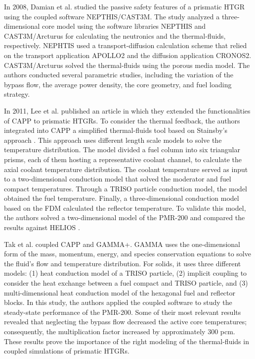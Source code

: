In 2008, Damian et al. \cite{damian_vhtr_2008} studied the passive safety features of a prismatic HTGR using the coupled software NEPTHIS/CAST3M\cite{cavalier_presentation_2005}\cite{studer_cast3marcturus_2007}.
The study analyzed a three-dimensional core model using the software libraries NEPTHIS and CAST3M/Arcturus for calculating the neutronics and the thermal-fluids, respectively.
NEPHTIS used a transport-diffusion calculation scheme that relied on the transport application APOLLO2 \cite{sanchez_apollo2_1999} and the diffusion application CRONOS2.
CAST3M/Arcturus solved the thermal-fluids using the porous media model.
The authors conducted several parametric studies, including the variation of the bypass flow, the average power density, the core geometry, and fuel loading strategy.

In 2011, Lee et al. published an article \cite{lee_development_2011} in which they extended the functionalities of CAPP to prismatic HTGRs.
To consider the thermal feedback, the authors integrated into CAPP a simplified thermal-fluids tool based on Stainsby's approach \cite{stainsby_investigation_2008}.
This approach uses different length scale models to solve the temperature distribution.
The model divided a fuel column into six triangular prisms, each of them hosting a representative coolant channel, to calculate the axial coolant temperature distribution.
The coolant temperature served as input to a two-dimensional conduction model that solved the moderator and fuel compact temperatures.
Through a TRISO particle conduction model, the model obtained the fuel temperature.
Finally, a three-dimensional conduction model based on the \gls{FDM} calculated the reflector temperature.
To validate this model, the authors solved a two-dimensional model of the PMR-200 and compared the results against HELIOS \cite{stammler_helios_1998}.

Tak et al. \cite{tak_cappgamma_2016} coupled CAPP and GAMMA+.
GAMMA uses the one-dimensional form of the mass, momentum, energy, and species conservation equations to solve the fluid's flow and temperature distribution.
For solids, it uses three different models: (1) heat conduction model of a TRISO particle, (2) implicit coupling to consider the heat exchange between a fuel compact and TRISO particle, and (3) multi-dimensional heat conduction model of the hexagonal fuel and reflector blocks.
In this study, the authors applied the coupled software to study the steady-state performance of the PMR-200.
Some of their most relevant results revealed that neglecting the bypass flow decreased the active core temperatures; consequently, the multiplication factor increased by approximately 300 pcm.
These results prove the importance of the right modeling of the thermal-fluids in coupled simulations of prismatic HTGRs.


